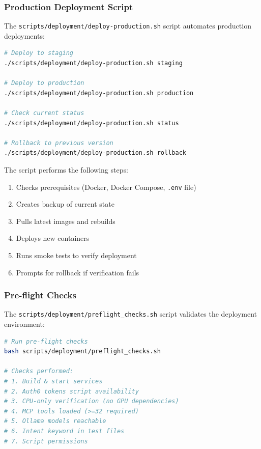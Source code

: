 \subsubsection{Production Deployment Script}

The \texttt{scripts/deployment/deploy-production.sh} script automates production deployments:

\begin{lstlisting}[language=bash, caption=Production deployment script usage]
# Deploy to staging
./scripts/deployment/deploy-production.sh staging

# Deploy to production
./scripts/deployment/deploy-production.sh production

# Check current status
./scripts/deployment/deploy-production.sh status

# Rollback to previous version
./scripts/deployment/deploy-production.sh rollback
\end{lstlisting}

The script performs the following steps:
\begin{enumerate}
    \item Checks prerequisites (Docker, Docker Compose, \texttt{.env} file)
    \item Creates backup of current state
    \item Pulls latest images and rebuilds
    \item Deploys new containers
    \item Runs smoke tests to verify deployment
    \item Prompts for rollback if verification fails
\end{enumerate}

\subsubsection{Pre-flight Checks}

The \texttt{scripts/deployment/preflight\_checks.sh} script validates the deployment environment:

\begin{lstlisting}[language=bash, caption=Pre-flight checks script]
# Run pre-flight checks
bash scripts/deployment/preflight_checks.sh

# Checks performed:
# 1. Build & start services
# 2. Auth0 tokens script availability
# 3. CPU-only verification (no GPU dependencies)
# 4. MCP tools loaded (>=32 required)
# 5. Ollama models reachable
# 6. Intent keyword in test files
# 7. Script permissions
\end{lstlisting}

